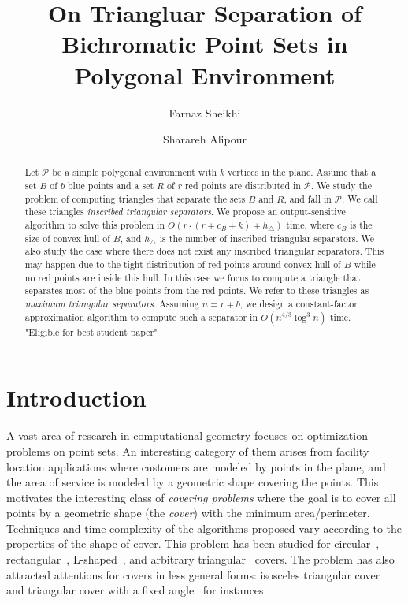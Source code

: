 \documentclass[a4paper,UKenglish]{lipics-v2018}
\author{Farnaz Sheikhi}{School of Computer Science, Institute for Research in Fundamental Sciences (IPM), Tehran, Iran.}{f.sheikhi@ipm.ir}{}{}%
\author{Sharareh Alipour}{School of Computer Science, Institute for Research in Fundamental Sciences (IPM), Tehran, Iran.}{alipour@ipm.ir}{}{}
\theoremstyle{definition}
\begin{document}
\title{On Triangluar Separation of Bichromatic Point Sets in Polygonal Environment}
\maketitle

\begin{abstract}
Let $\mathcal P$ be a simple polygonal environment with $k$ vertices in the plane. Assume that a set $B$ of $b$ blue points and a set $R$ of $r$ red points are distributed in $\mathcal P$. We study the problem of computing triangles that separate the sets $B$ and $R$, and fall in  $\mathcal P$. We call these triangles \emph{inscribed triangular separators}. We propose an output-sensitive algorithm to solve this problem in $O(r \cdot (r+c_B+k)+h_\triangle)$ time, where $c_B$ is the size of convex hull of $B$, and $h_\triangle$ is the number of inscribed triangular separators. We also study the case where there does not exist any inscribed triangular separators. This may happen due to the tight distribution of red points around convex hull of $B$ while no red points are inside this hull. In this case we focus to compute a triangle that separates most of the blue points from the red points. We refer to these triangles as \emph{maximum triangular separators}. Assuming $n=r+b$, we design a constant-factor approximation algorithm to compute such a separator in $O(n^{4/3} \log^3 n)$ time. 
"Eligible for best student paper"
\end{abstract}

\section{Introduction}

A vast area of research in computational geometry focuses on optimization problems on point sets. An interesting category of them arises from facility location applications where customers are modeled by points in the plane, and the area of service is modeled by a geometric shape covering the points. This motivates the interesting class of \emph{covering problems} where the goal is to cover all points by a geometric shape (the \emph{cover}) with the minimum area/perimeter. Techniques and time complexity of the algorithms proposed vary according to the properties of the shape of cover. This problem has been studied for circular~\cite{Megiddo-LP}, rectangular~\cite{rotating-cal}, L-shaped~\cite{L-cover}, and arbitrary triangular~\cite{tri-rourke,tri-chang,tri-ag} covers. The problem has also attracted attentions for covers in less general forms:  isosceles triangular cover~\cite{bose1} and triangular cover with a fixed angle~\cite{bose2} for instances.
\end{document}
